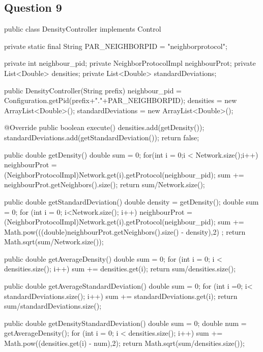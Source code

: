 \documentclass[10pt]{report}
\begin{document}
\subsection{Question 9}

\begin{boxedlisting}
public class DensityController implements Control{

	private static final String PAR_NEIGHBORPID = "neighborprotocol";

	private int neighbour_pid;
	private NeighborProtocolImpl neighbourProt;
	private List<Double> densities;
	private List<Double> standardDeviations;
	
	public DensityController(String prefix) {
		neighbour_pid = Configuration.getPid(prefix+"."+PAR_NEIGHBORPID);
		densities = new ArrayList<Double>();
		standardDeviations  = new ArrayList<Double>();
	}

	@Override
	public boolean execute() {
		densities.add(getDensity());
		standardDeviations.add(getStandardDeviation());
		return false;
	}

	public double getDensity() {
		double sum = 0;
		for(int i = 0;i < Network.size();i++) {
			neighbourProt = (NeighborProtocolImpl)Network.get(i).getProtocol(neighbour_pid);
			sum += neighbourProt.getNeighbors().size();
		}
		return sum/Network.size();
	}
	
	public double getStandardDeviation() {
		double density = getDensity();
		double sum = 0;
		for (int i = 0; i<Network.size(); i++) {
			neighbourProt = (NeighborProtocolImpl)Network.get(i).getProtocol(neighbour_pid);
			 sum += Math.pow(((double)neighbourProt.getNeighbors().size() - density),2) ;
		}
		return Math.sqrt(sum/Network.size());
	}
	
	public double getAverageDensity() {
		double sum = 0;
		for (int i = 0; i < densities.size(); i++) {
			sum += densities.get(i);
		}
		return sum/densities.size();
	}
	
	public double getAverageStandardDeviation() {
		double sum = 0;
		for (int i =0; i< standardDeviations.size(); i++) {
			sum += standardDeviations.get(i);
		}
		return sum/standardDeviations.size();
	}
	
	public double getDensityStandardDeviation() {
		double sum = 0;
		double num = getAverageDensity();
		for (int i = 0; i < densities.size(); i++) {
			sum += Math.pow((densities.get(i) - num),2);
		}
		return Math.sqrt(sum/densities.size());
	}	
}
\end{boxedlisting}
\end{document}
